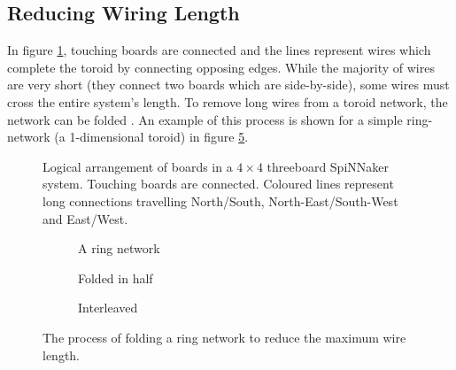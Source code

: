 		\subsection{Reducing Wiring Length}
			
			\label{sec:folding-toroids}
			
			In figure \ref{fig:boardsLogical}, touching boards are connected and the
			lines represent wires which complete the toroid by connecting opposing
			edges. While the majority of wires are very short (they connect two boards
			which are side-by-side), some wires must cross the entire system's length.
			To remove long wires from a toroid network, the network can be folded
			\cite{dally04}. An example of this process is shown for a simple
			ring-network (a 1-dimensional toroid) in figure \ref{fig:folding}.
			
			\begin{figure}
				\center
				
				\caption[Logical arrangement of boards in a $4\times4$ threeboard
				SpiNNaker system.]{Logical arrangement of boards in a $4\times4$
				threeboard SpiNNaker system. Touching boards are connected. Coloured
				lines represent long connections travelling {\color{red}North/South},
				{\color{green}North-East/South-West} and {\color{blue}East/West}.}
				\label{fig:boardsLogical}
			\end{figure}
			
			\begin{figure}
				\begin{subfigure}[b]{\textwidth}
					\center
					
					\caption{A ring network}
					\label{fig:ringLong}
				\end{subfigure}
				
				\vspace{2ex}
				
				\begin{subfigure}[b]{\textwidth}
					\center
					
					\caption{Folded in half}
					\label{fig:ringFolded}
				\end{subfigure}
				
				\vspace{2ex}
				
				\begin{subfigure}[b]{\textwidth}
					\center
					
					\caption{Interleaved}
					\label{fig:ringInterleaved}
				\end{subfigure}
				
				\caption[Folding a ring network.]{The process of folding a ring network
				to reduce the maximum wire length.}
				\label{fig:folding}
			\end{figure}
			
